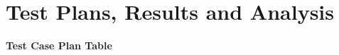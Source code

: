 


\section{Test Plans, Results and Analysis}



\begin{center}
    \textbf{Test Case Plan Table}
\end{center}

